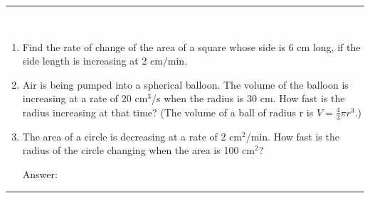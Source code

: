 \documentclass[../calc1-main.tex]{subfiles}
\begin{document}
\rule{\textwidth}{1pt}
\begin{multicols}{2}
\begin{exercise}
~\\
  \begin{enumerate}
    \item Find the rate of change of the area of a square whose side is 6 cm long, if the side length is increasing at 2 cm/min.
    \item Air is being pumped into a spherical balloon. The volume of the balloon is increasing at a rate of 20 cm$^3$/s when the radius is 30 cm. How fast is the radius increasing at that time? (The volume of a ball of radius r is $V=\frac{4}{3} \pi r^3$.)

    \item The area of a circle is decreasing at a rate of 2 cm$^2$/min. How fast is the radius of the circle changing when the area is 100 cm$^2$?

    Answer:
  \end{enumerate}
\end{exercise}
\end{multicols}
\rule{\textwidth}{1pt}
\end{document}
